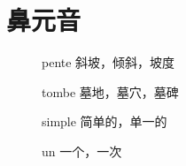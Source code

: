 \section{鼻元音}

\begin{description}
\item[\textipa{[\~a]}] pente \textipa{[p\~at]} 斜坡，倾斜，坡度
\item[\textipa{[\~O]}] tombe \textipa{[t\~ob]} 墓地，墓穴，墓碑
\item[\textipa{[\~e]}] simple \textipa{[s\~epl]} 简单的，单一的
\item[\textipa{[\~\oe]}] un \textipa{[\~\oe]} 一个，一次
\end{description}



